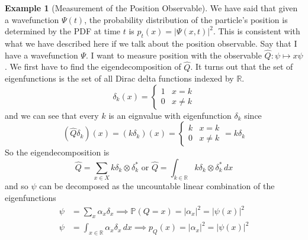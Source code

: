 \documentclass{article}
\theoremstyle{definition}
\newtheorem{example}{Example}[section]
\begin{document}
    \begin{example}[Measurement of the Position Observable]
      We have said that given a wavefunction $\Psi (t)$, the probability distribution of the particle's position is determined by the PDF at time $t$ is $p_t (x) = |\Psi(x, t)|^2$. This is consistent with what we have described here if we talk about the position observable. Say that I have a wavefunction $\Psi$. I want to measure position with the observable $\hat{Q} : \psi \mapsto x \psi$. We first have to find the eigendecomposition of $\hat{Q}$. It turns out that the set of eigenfunctions is the set of all Dirac delta functions indexed by $\mathbb{R}$. 
      \begin{equation} 
        \delta_k (x) = \begin{cases} 1 & x = k \\ 0 & x \neq k \end{cases} 
      \end{equation}
      and we can see that every $k$ is an eignvalue with eigenfunction $\delta_k$ since 
      \begin{equation} 
        (\hat{Q} \delta_k)(x) = (k \delta_k) (x) = \begin{cases} k & x = k \\ 0 & x \neq k \end{cases} = k \delta_k 
      \end{equation}
      So the eigendecomposition is 
      \begin{equation} 
        \hat{Q} = \sum_{x \in X} k \delta_k \otimes \delta_k^\ast \text{ or } \hat{Q} = \int_{k \in \mathbb{R}} k \delta_k \otimes \delta_k^\ast \,dx 
      \end{equation}
      and so $\psi$ can be decomposed as the uncountable linear combination of the eigenfunctions 
      \begin{align*} 
        \psi & = \sum_x \alpha_x \delta_x \implies \mathbb{P}(Q = x) = |\alpha_x|^2  = | \psi(x) |^2\\  
        \psi & = \int_{x \in \mathbb{R}} \alpha_x \delta_x \,dx \implies p_Q (x) = |\alpha_x|^2 = |\psi(x)|^2 
      \end{align*}
    \end{example}   
\end{document}
